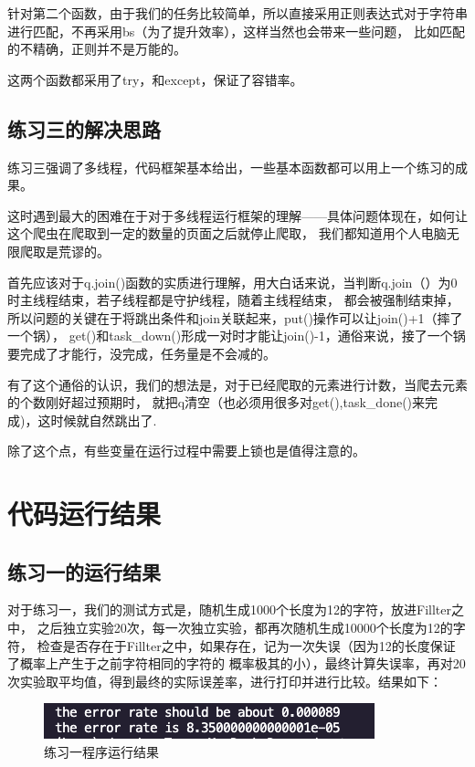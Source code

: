 \documentclass[UTF8]{ctexart}
\begin{document}
            针对第二个函数，由于我们的任务比较简单，所以直接采用正则表达式对于字符串进行匹配，不再采用bs（为了提升效率），这样当然也会带来一些问题，
            比如匹配的不精确，正则并不是万能的。\par

            这两个函数都采用了try，和except，保证了容错率。
        \subsection{练习三的解决思路}
            练习三强调了多线程，代码框架基本给出，一些基本函数都可以用上一个练习的成果。\par
            这时遇到最大的困难在于对于多线程运行框架的理解——具体问题体现在，如何让这个爬虫在爬取到一定的数量的页面之后就停止爬取，
            我们都知道用个人电脑无限爬取是荒谬的。\par
            首先应该对于q.join()函数的实质进行理解，用大白话来说，当判断q.join（）为0时主线程结束，若子线程都是守护线程，随着主线程结束，
            都会被强制结束掉，所以问题的关键在于将跳出条件和join关联起来，put()操作可以让join()+1（摔了一个锅），
            get()和task\_down()形成一对时才能让join()-1，通俗来说，接了一个锅要完成了才能行，没完成，任务量是不会减的。\par
            有了这个通俗的认识，我们的想法是，对于已经爬取的元素进行计数，当爬去元素的个数刚好超过预期时，
            就把q清空（也必须用很多对get(),task\_done()来完成)，这时候就自然跳出了.\par
            除了这个点，有些变量在运行过程中需要上锁也是值得注意的。
    \section{代码运行结果}
        \subsection{练习一的运行结果}
            对于练习一，我们的测试方式是，随机生成1000个长度为12的字符，放进Fillter之中，
            之后独立实验20次，每一次独立实验，都再次随机生成10000个长度为12的字符，
            检查是否存在于Fillter之中，如果存在，记为一次失误（因为12的长度保证了概率上产生于之前字符相同的字符的
            概率极其的小），最终计算失误率，再对20次实验取平均值，得到最终的实际误差率，进行打印并进行比较。结果如下：
            \begin{figure}[ht]
                \centering
                \includegraphics[scale=0.75]{img/error.png}
                \caption{练习一程序运行结果}
            \end{figure}
            
\end{document}
